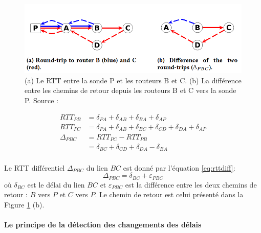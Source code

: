 \begin{figure}[H]
	\centering
	\captionsetup{justification= centering}
	\includegraphics[width=0.7\linewidth]{illustrations/rtt-differ}
	\caption{(a) Le RTT entre la sonde P et les routeurs B et C. (b) La différence entre les  chemins de retour depuis les routeurs B et C vers la sonde P. Source : \cite{DBLP:journals/corr/FontugneAPB16}}
	\label{fig:rtt-differ}
\end{figure} 
\begin{align*}
RTT_{PB} & =  \delta_{PA} + \delta_{AB} + \delta_{BA} + \delta_{AP}\\
RTT_{PC} & = \delta_{PA} + \delta_{AB} + \delta_{BC} + \delta_{CD} + \delta_{DA}+ \delta_{AP}\\
\Delta_{PBC} & = RTT_{PC} - RTT_{PB} \\ 
& =  \delta_{BC} + \delta_{CD} + \delta_{DA}- \delta_{BA} \\
\end{align*}

Le RTT différentiel $ \Delta_{PBC} $ du lien $ BC $ est  donné par l'équation \ref{eq:rttdiff}:
\begin{equation}
\Delta_{PBC} = \delta_{BC} + \varepsilon_{PBC}
\label{eq:rttdiff}
\end{equation}
où $\delta_{BC}$ est le délai du lien $BC$ et $\varepsilon_{PBC}$ est la différence entre les deux chemins de retour : $B$ vers $P$ et $C$ vers $P$.  Le chemin de retour est celui  présenté dans  la Figure \ref{fig:rtt-differ} (b). 


\paragraph{Le principe de la détection des changements des délais}~

